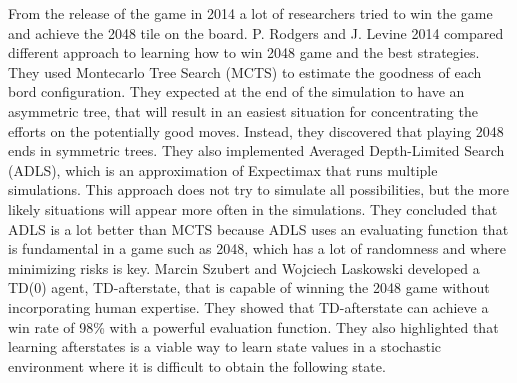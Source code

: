 From the release of the game in 2014 a lot of researchers tried to win the game and achieve the 2048 tile on the board.
P. Rodgers and J. Levine\cite{ai-strat} 2014 compared different approach to learning how to win 2048 game and the best strategies. They used Montecarlo Tree Search (MCTS) to estimate the goodness of each bord configuration. They expected at the end of the simulation to have an asymmetric tree, that will result in an easiest situation for concentrating the efforts on the potentially good moves. Instead, they discovered that playing 2048 ends in symmetric trees.
They also implemented Averaged Depth-Limited Search (ADLS), which is an approximation of Expectimax that runs multiple simulations. This approach does not try to simulate all possibilities, but the more likely situations will appear more often in the simulations. They concluded that ADLS is a lot better than MCTS because ADLS uses an evaluating function that is fundamental in a game such as 2048, which has a lot of randomness and where minimizing risks is key.
Marcin Szubert and Wojciech Laskowski\cite{td-after} developed a TD(0)\cite{td} agent, TD-afterstate, that is capable of winning the 2048 game without incorporating human expertise. They showed that TD-afterstate can achieve a win rate of 98\% with a powerful evaluation function. They also highlighted that learning afterstates is a viable way to learn state values in a stochastic environment where it is difficult to obtain the following state.